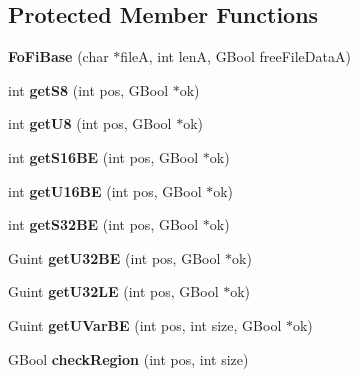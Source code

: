 \subsection*{Protected Member Functions}
\begin{DoxyCompactItemize}
\item 
\mbox{\label{class_fo_fi_base_a9a8977dad704eccf03ca1de58adc17a2}} 
{\bfseries Fo\+Fi\+Base} (char $\ast$fileA, int lenA, G\+Bool free\+File\+DataA)
\item 
\mbox{\label{class_fo_fi_base_a248dc1443113afbe220907bc16a81168}} 
int {\bfseries get\+S8} (int pos, G\+Bool $\ast$ok)
\item 
\mbox{\label{class_fo_fi_base_ade5968433548b72417fed10bdf084c91}} 
int {\bfseries get\+U8} (int pos, G\+Bool $\ast$ok)
\item 
\mbox{\label{class_fo_fi_base_a305d300888460c0629f4b5fdd1b05374}} 
int {\bfseries get\+S16\+BE} (int pos, G\+Bool $\ast$ok)
\item 
\mbox{\label{class_fo_fi_base_a22cf7335edb9fb3eb36d8801d02096c5}} 
int {\bfseries get\+U16\+BE} (int pos, G\+Bool $\ast$ok)
\item 
\mbox{\label{class_fo_fi_base_ac55f53dbda9b5c9c94936b84b86a3abe}} 
int {\bfseries get\+S32\+BE} (int pos, G\+Bool $\ast$ok)
\item 
\mbox{\label{class_fo_fi_base_a63445fb4cb7c57b77854d4d79a93a3e8}} 
Guint {\bfseries get\+U32\+BE} (int pos, G\+Bool $\ast$ok)
\item 
\mbox{\label{class_fo_fi_base_a7fb243c543b20fd08b29e7e84752e281}} 
Guint {\bfseries get\+U32\+LE} (int pos, G\+Bool $\ast$ok)
\item 
\mbox{\label{class_fo_fi_base_a9aca939690d27dda8ad4a173f910cb6e}} 
Guint {\bfseries get\+U\+Var\+BE} (int pos, int size, G\+Bool $\ast$ok)
\item 
\mbox{\label{class_fo_fi_base_a7d15e8fd9b3ffe054ee3250125e286e1}} 
G\+Bool {\bfseries check\+Region} (int pos, int size)
\end{DoxyCompactItemize}
